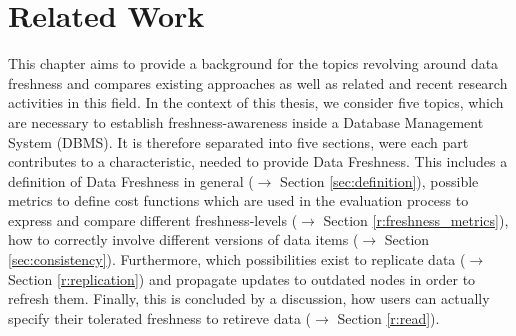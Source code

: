 \chapter{Related Work}
\label{c:related}



This chapter aims to provide a background for the topics revolving around data freshness and compares existing approaches 
as well as related and recent research activities in this field. 
In the context of this thesis, we consider five topics, which are necessary to establish 
freshness-awareness inside a Database Management System (DBMS).
It is therefore separated into five sections, were each part contributes to a characteristic, needed to 
provide Data Freshness. This includes a definition of Data Freshness in general ($\rightarrow$ Section \ref{sec:definition}), 
possible metrics to define cost functions which are used
in the evaluation process to express and compare different freshness-levels ($\rightarrow$ Section \ref{r:freshness_metrics}), 
how to correctly involve different versions of data items ($\rightarrow$ Section \ref{sec:consistency}). 
Furthermore, which possibilities exist to replicate data ($\rightarrow$ Section \ref{r:replication}) 
and propagate updates to outdated nodes in order to refresh them.
Finally, this is concluded by a discussion, how users can actually specify their tolerated freshness to retireve data ($\rightarrow$ Section \ref{r:read}).






